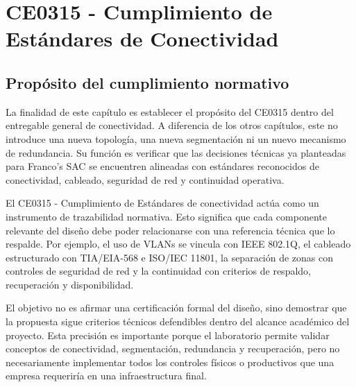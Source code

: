 \documentclass[11pt, a4paper, oneside]{report}
\begin{document}
\chapter{CE0315 - Cumplimiento de Estándares de Conectividad}

\section{Propósito del cumplimiento normativo}

La finalidad de este capítulo es establecer el propósito del CE0315 dentro del entregable general de conectividad. A diferencia de los otros capítulos, este no introduce una nueva topología, una nueva segmentación ni un nuevo mecanismo de redundancia. Su función es verificar que las decisiones técnicas ya planteadas para Franco's SAC se encuentren alineadas con estándares reconocidos de conectividad, cableado, seguridad de red y continuidad operativa.

El CE0315 - Cumplimiento de Estándares de conectividad actúa como un instrumento de trazabilidad normativa. Esto significa que cada componente relevante del diseño debe poder relacionarse con una referencia técnica que lo respalde. Por ejemplo, el uso de VLANs se vincula con IEEE 802.1Q, el cableado estructurado con TIA/EIA-568 e ISO/IEC 11801, la separación de zonas con controles de seguridad de red y la continuidad con criterios de respaldo, recuperación y disponibilidad.

El objetivo no es afirmar una certificación formal del diseño, sino demostrar que la propuesta sigue criterios técnicos defendibles dentro del alcance académico del proyecto. Esta precisión es importante porque el laboratorio permite validar conceptos de conectividad, segmentación, redundancia y recuperación, pero no necesariamente implementar todos los controles físicos o productivos que una empresa requeriría en una infraestructura final.

\renewcommand{\arraystretch}{1.3}
\footnotesize
{}
\end{document}

